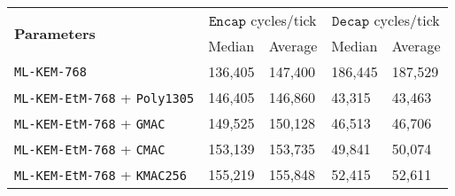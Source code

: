 \documentclass[runningheads]{llncs}
\newcommand{\keygen}{\texttt{KeyGen}}
\newcommand{\encap}{\texttt{Encap}}
\newcommand{\decap}{\texttt{Decap}}
\newcommand{\pk}{\texttt{pk}}
\newcommand{\sk}{\texttt{sk}}
\begin{document}
\begin{table}[h]
    \begin{tabular}[t]{|p{15em}|p{5em}|p{5em}|p{5em}|p{5em}|}
        \hline
        \multirow{2}{*}{\bf Parameters} 
        & \multicolumn{2}{|c|}{$\encap$ cycles/tick} 
        & \multicolumn{2}{|c|}{$\decap$ cycles/tick} \\
        \cline{2-5}
        & Median & Average & Median & Average \\
        \hline
        \texttt{ML-KEM-768} & 136,405 & 147,400 & 186,445 & 187,529 \\
        \hline
        \texttt{ML-KEM-EtM-768} + \texttt{Poly1305} & 146,405 & 146,860 & 43,315 & 43,463 \\
        \hline
        \texttt{ML-KEM-EtM-768} + \texttt{GMAC} & 149,525 & 150,128 & 46,513 & 46,706 \\
        \hline
        \texttt{ML-KEM-EtM-768} + \texttt{CMAC} & 153,139 & 153,735 & 49,841 & 50,074 \\
        \hline
        \texttt{ML-KEM-EtM-768} + \texttt{KMAC256} & 155,219 & 155,848 & 52,415 & 52,611 \\
        \hline
    \end{tabular}\vspace{0.3cm}


\end{table}
\end{document}

